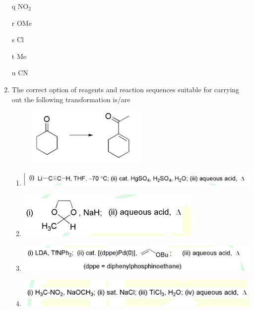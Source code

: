 \documentclass[journal,12pt,onecolumn]{IEEEtran}
\theoremstyle{remark}
\begin{document}
\begin{enumerate}
q \quad NO$_{2}$

r \quad OMe

s \quad Cl

t \quad Me

u \quad CN
    \begin{enumerate}
    \end{enumerate}      \hfill{}



\item The correct option of reagents and reaction sequences suitable for carrying out the following transformation is/are
 \begin{figure}[H]   
        \centering
        \includegraphics[width=0.4\columnwidth]{figs/q53.png}
        \caption*{}
        \label{fig:placeholder}
    \end{figure}
    \begin{enumerate}
  
        \item \includegraphics[width=0.6\columnwidth]{figs/q53a.png}
        \item \includegraphics[width=0.6\columnwidth]{figs/q53b.png}
        \item \includegraphics[width=0.6\columnwidth]{figs/q53c.png}
        \item \includegraphics[width=0.6\columnwidth]{figs/q53d.png}
   

\end{enumerate}
\end{enumerate}
\end{document}

